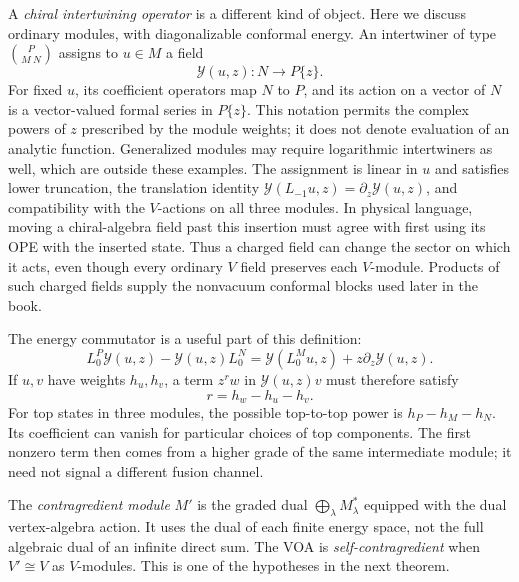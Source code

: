 A \emph{chiral intertwining operator} is a different kind of object.
Here we discuss ordinary modules, with diagonalizable conformal energy.
An intertwiner of type $\binom{P}{M\ N}$ assigns to $u\in M$ a field
\[
 \mathcal Y(u,z):N\longrightarrow P\{z\}.
\]
For fixed $u$, its coefficient operators map $N$ to $P$, and its
action on a vector of $N$ is a vector-valued formal series in
$P\{z\}$. This notation permits the complex powers of $z$
prescribed by the module weights; it does not denote evaluation
of an analytic function. Generalized modules may require logarithmic
intertwiners as well, which are outside these examples.
The assignment is linear in $u$ and satisfies lower truncation, the
translation identity
$\mathcal Y(L_{-1}u,z)=\partial_z\mathcal Y(u,z)$, and compatibility
with the $V$-actions on all three modules. In physical language, moving
a chiral-algebra field past this insertion must agree with first using
its OPE with the inserted state. Thus a charged field can change the
sector on which it acts, even though every ordinary $V$ field preserves
each $V$-module. Products of such charged fields supply the nonvacuum
conformal blocks used later in the book.

The energy commutator is a useful part of this definition:
\[
 L_0^P\mathcal Y(u,z)-\mathcal Y(u,z)L_0^N
 =\mathcal Y(L_0^Mu,z)+z\partial_z\mathcal Y(u,z).
\]
If $u,v$ have weights $h_u,h_v$, a term $z^r w$ in
$\mathcal Y(u,z)v$ must therefore satisfy
\begin{equation}
 r=h_w-h_u-h_v.
 \label{eq:voa-intertwiner-power}
\end{equation}
For top states in three modules, the possible top-to-top power is
$h_P-h_M-h_N$. Its coefficient can vanish for particular choices of
top components. The first nonzero term then comes from a higher grade
of the same intermediate module; it need not signal a different
fusion channel.

The \emph{contragredient module} $M'$ is the graded dual
$\bigoplus_\lambda M_\lambda^*$ equipped with the dual
vertex-algebra action. It uses the dual of each finite energy space,
not the full algebraic dual of an infinite direct sum.
The VOA is \emph{self-contragredient} when $V'\cong V$ as
$V$-modules. This is one of the hypotheses in the next theorem.

